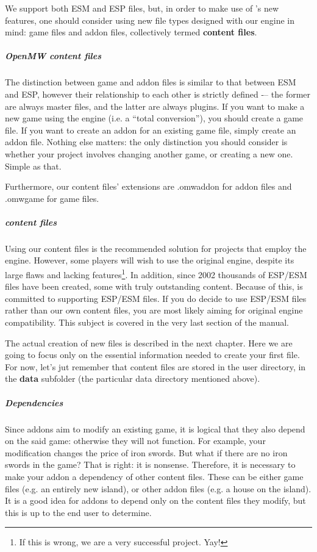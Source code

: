 We support both ESM and ESP files, but, in order to make use of \OMW{}'s new features, one should consider using new file types designed
with our engine in mind: game files and addon files, collectively termed \textbf{content files}.

\subparagraph{OpenMW content files}
The distinction between game and addon files is similar to that between ESM and ESP, however their relationship to each other is
strictly defined -– the former are always master files, and the latter are always plugins. If you want to make a new game using the \OMW{}
engine (i.e. a ``total conversion''), you should create a game file. If you want to create an addon for an existing game file, simply
create an addon file. Nothing else matters: the only distinction you should consider is whether your project involves changing another game, 
or creating a new one. Simple as that.

Furthermore, our content files’ extensions are .omwaddon for addon files and .omwgame for game files.

\subparagraph{\MW{} content files}
Using our content files is the recommended solution for projects that employ the \OMW{} engine. However, some players will wish to use 
the original \MW{} engine, despite its large flaws and lacking features\footnote{If this is wrong, we are a very successful project. Yay!}. 
In addition, since 2002 thousands of ESP/ESM files have been created, some with truly outstanding content. Because of this, \OCS{} is
committed to supporting ESP/ESM files. If you do decide to use ESP/ESM files rather than our own content files, you are most likely aiming
for original engine compatibility. This subject is covered in the very last section of the manual. 

The actual creation of new files is described in the next chapter. Here we are going to focus only on the essential information needed
to create your first \OCS{} file. For now, let's jut remember that content files are stored in the user directory, in the \textbf{data} subfolder (the particular data directory mentioned above).

\subparagraph{Dependencies}
Since addons aim to modify an existing game, it is logical that they also depend on the said game: otherwise they will not function.
For example, your modification changes the price of iron swords. But what if there are no iron swords in the game? That is right:
it is nonsense. Therefore, it is necessary to make your addon a dependency of other content files. These can be either game files
(e.g. an entirely new island), or other addon files (e.g. a house on the island). It is a good idea for addons to depend only on the
content files they modify, but this is up to the end user to determine.

